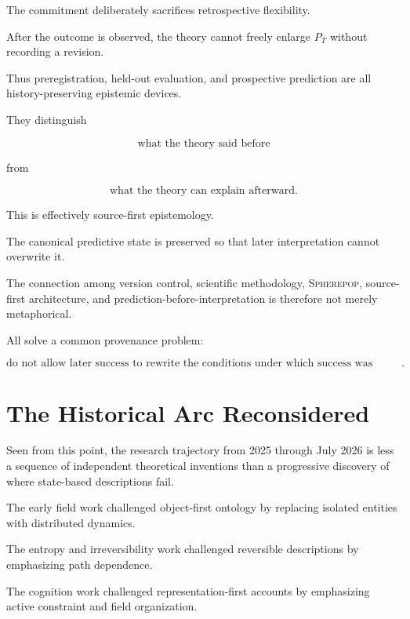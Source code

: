 \documentclass[11pt]{article}
\theoremstyle{remark}
\newcommand{\Spherepop}{\textsc{Spherepop}}
\begin{document}
The commitment deliberately sacrifices retrospective flexibility.

After the outcome is observed, the theory cannot freely enlarge $P_T$ without recording a revision.

Thus preregistration, held-out evaluation, and prospective prediction are all history-preserving epistemic devices.

They distinguish

\begin{equation}
\text{what the theory said before}
\end{equation}

from

\begin{equation}
\text{what the theory can explain afterward}.
\end{equation}

This is effectively source-first epistemology.

The canonical predictive state is preserved so that later interpretation cannot overwrite it.

The connection among version control, scientific methodology, \Spherepop{}, source-first architecture, and prediction-before-interpretation is therefore not merely metaphorical.

All solve a common provenance problem:

\begin{equation}
\boxed{
\text{do not allow later success to rewrite the conditions under which success was evaluated}.
}
\end{equation}

\section{The Historical Arc Reconsidered}

Seen from this point, the research trajectory from 2025 through July 2026 is less a sequence of independent theoretical inventions than a progressive discovery of where state-based descriptions fail.

The early field work challenged object-first ontology by replacing isolated entities with distributed dynamics.

The entropy and irreversibility work challenged reversible descriptions by emphasizing path dependence.

The cognition work challenged representation-first accounts by emphasizing active constraint and field organization.
\end{document}
